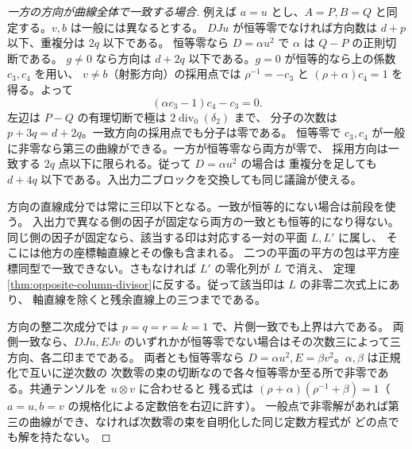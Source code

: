 \begin{proof}[一方の方向が曲線全体で一致する場合]
例えば $a=u$ とし、$A=P,B=Q$ と同定する。$v,b$ は一般には異なるとする。
$D Ju$ が恒等零でなければ方向数は $d+p$ 以下、重複分は $2q$ 以下である。
恒等零なら $D=\alpha u^2$ で $\alpha$ は $Q-P$ の正則切断である。
$g\ne0$ なら方向は $d+2q$ 以下である。$g=0$ が恒等的なら上の係数 $c_3,c_4$ を用い、
$v\ne b$（射影方向）の採用点では $\rho^{-1}=-c_3$ と
$(\rho+\alpha)c_4=1$ を得る。よって
\[
                       (\alpha c_3-1)c_4-c_3=0 .
\]
左辺は $P-Q$ の有理切断で極は $2\operatorname{div}_0(\delta_2)$ まで、
分子の次数は $p+3q=d+2q$。一致方向の採用点でも分子は零である。
恒等零で $c_3,c_4$ が一般に非零なら第三の曲線ができる。一方が恒等零なら両方が零で、
採用方向は一致する $2q$ 点以下に限られる。従って $D=\alpha u^2$ の場合は
重複分を足しても $d+4q$ 以下である。入出力二ブロックを交換しても同じ議論が使える。

方向の直線成分では常に三印以下となる。一致が恒等的にない場合は前段を使う。
入出力で異なる側の因子が固定なら両方の一致とも恒等的になり得ない。
同じ側の因子が固定なら、該当する印は対応する一対の平面 $L,L'$ に属し、
そこには他方の座標軸直線とその像も含まれる。
二つの平面の平方の包は平方座標同型で一致できない。さもなければ $L'$ の零化列が $L$ で消え、
定理\ref{thm:opposite-column-divisor}に反する。従って該当印は $L$ の非零二次式上にあり、
軸直線を除くと残余直線上の三つまでである。

方向の整二次成分では $p=q=r=k=1$ で、片側一致でも上界は六である。
両側一致なら、$D Ju,E Jv$ のいずれかが恒等零でない場合はその次数三によって三方向、各二印までである。
両者とも恒等零なら $D=\alpha u^2,E=\beta v^2$。$\alpha,\beta$ は正規化で互いに逆次数の
次数零の束の切断なので各々恒等零か至る所で非零である。共通テンソルを $u\otimes v$ に合わせると
残る式は $(\rho+\alpha)(\rho^{-1}+\beta)=1$（$a=u,b=v$ の規格化による定数倍を右辺に許す）。
一般点で非零解があれば第三の曲線ができ、なければ次数零の束を自明化した同じ定数方程式が
どの点でも解を持たない。
\end{proof}
